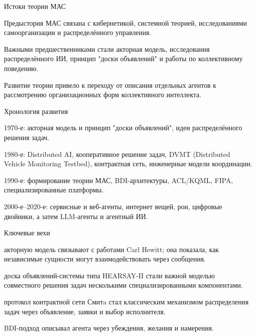 \begin{frame}{Истоки теории МАС}
	\topline
	\justifying
	\begin{textitemize}
		\item Предыстория МАС связана с кибернетикой, системной теорией, исследованиями самоорганизации и распределённого управления.
		\item Важными предшественниками стали акторная модель, исследования распределённого ИИ, принцип "доски объявлений"{} и работы по коллективному поведению.
		\item Развитие теории привело к переходу от описания отдельных агентов к рассмотрению организационных форм коллективного интеллекта.
	\end{textitemize}
\end{frame}

\begin{frame}{Хронология развития}
	\topline
	\justifying
	\begin{textitemize}
		\item 1970-е: акторная модель и принцип "доски объявлений"{}, идеи распределённого решения задач.
		\item 1980-е: Distributed AI, кооперативное решение задач, DVMT (Distributed Vehicle Monitoring Testbed), контрактная сеть, инженерные модели координации.
		\item 1990-е: формирование теории МАС, BDI-архитектуры, ACL/KQML, FIPA, специализированные платформы.
		\item 2000-е--2020-е: сервисные и веб-агенты, интернет вещей, рои, цифровые двойники, а затем LLM-агенты и агентный ИИ.
	\end{textitemize}
\end{frame}

\begin{frame}{Ключевые вехи}
	\topline
	\justifying
	\begin{textitemize}
		\item акторную модель связывают с работами Carl Hewitt; она показала, как независимые сущности могут взаимодействовать через сообщения.
		\item доска объявлений-системы типа HEARSAY-II стали важной моделью совместного решения задач несколькими специализированными компонентами.
		\item протокол контрактной сети Смитa стал классическим механизмом распределения задач через объявление, заявки и выбор исполнителя.
		\item BDI-подход описывал агента через убеждения, желания и намерения.
	\end{textitemize}
\end{frame}


